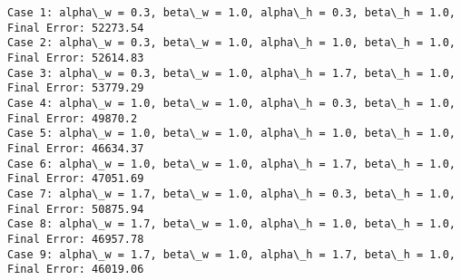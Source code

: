 \documentclass[11pt]{article}
\begin{document}
    \begin{Verbatim}[commandchars=\\\{\}]
Case 1: alpha\_w = 0.3, beta\_w = 1.0, alpha\_h = 0.3, beta\_h = 1.0,  Final Error: 52273.54
Case 2: alpha\_w = 0.3, beta\_w = 1.0, alpha\_h = 1.0, beta\_h = 1.0,  Final Error: 52614.83
Case 3: alpha\_w = 0.3, beta\_w = 1.0, alpha\_h = 1.7, beta\_h = 1.0,  Final Error: 53779.29
Case 4: alpha\_w = 1.0, beta\_w = 1.0, alpha\_h = 0.3, beta\_h = 1.0,  Final Error: 49870.2
Case 5: alpha\_w = 1.0, beta\_w = 1.0, alpha\_h = 1.0, beta\_h = 1.0,  Final Error: 46634.37
Case 6: alpha\_w = 1.0, beta\_w = 1.0, alpha\_h = 1.7, beta\_h = 1.0,  Final Error: 47051.69
Case 7: alpha\_w = 1.7, beta\_w = 1.0, alpha\_h = 0.3, beta\_h = 1.0,  Final Error: 50875.94
Case 8: alpha\_w = 1.7, beta\_w = 1.0, alpha\_h = 1.0, beta\_h = 1.0,  Final Error: 46957.78
Case 9: alpha\_w = 1.7, beta\_w = 1.0, alpha\_h = 1.7, beta\_h = 1.0,  Final Error: 46019.06

    \end{Verbatim}
\end{document}
